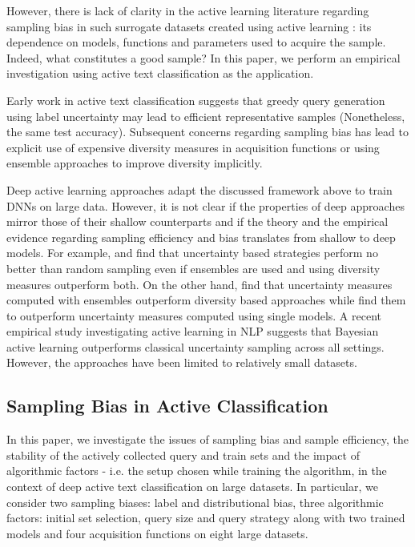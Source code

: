 \documentclass[11pt,a4paper]{article}
\begin{document}
However, there is lack of clarity in the active learning literature regarding sampling bias in such surrogate datasets created using active learning \cite{settles2009active}: its dependence on models, functions and parameters used to acquire the sample. Indeed, what constitutes a good sample? In this paper, we perform an empirical investigation using active text classification as the application.
 
Early work in active text classification \cite{lewis1994sequential} suggests that greedy query generation using label uncertainty may lead to efficient representative samples (Nonetheless, the same test accuracy). Subsequent concerns regarding sampling bias has lead to explicit use of expensive diversity measures \cite{brinker2003incorporating, hoi2006large} in acquisition functions or using ensemble approaches \cite{liere1997active, mccallum1998employing} to improve diversity implicitly. 

Deep active learning approaches adapt the discussed framework above to train DNNs on large data. However, it is not clear if the properties of deep approaches mirror those of their shallow counterparts and if the theory and the empirical evidence regarding sampling efficiency and bias translates from shallow to deep models. For example, \cite{sener2018active} and \cite{ducoffe2018adversarial} find that uncertainty based strategies perform no better than random sampling even if ensembles are used and using diversity measures outperform both. On the other hand, \cite{beluch2018power, gissin2019discriminative} find that uncertainty measures computed with ensembles outperform diversity based approaches while \cite{gal2017deep, beluch2018power, siddhant2018deep} find them to outperform uncertainty measures computed using single models. A recent empirical study \cite{siddhant2018deep} investigating active learning in NLP suggests that Bayesian active learning outperforms classical uncertainty sampling across all settings. However, the approaches have been limited to relatively small datasets. 

\subsection{Sampling Bias in Active Classification}
In this paper, we investigate the issues of sampling bias and sample efficiency, the stability of the actively collected query and train sets and the impact of algorithmic factors  - i.e. the setup chosen while training the algorithm, in the context of deep active text classification on large datasets. In particular, we consider two sampling biases: label and distributional bias, three algorithmic factors: initial set selection, query size and query strategy along with two trained models and four acquisition functions on eight large datasets. 
\end{document}
